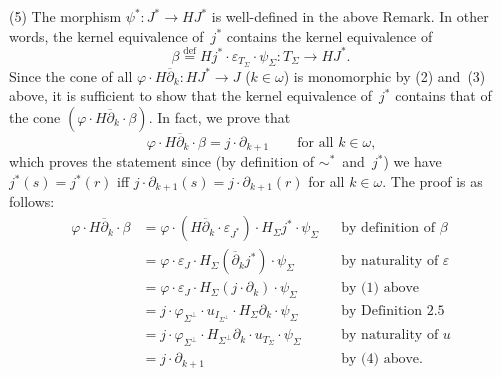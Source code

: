 \documentclass{entcs}
\newcommand{\sims}{\ensuremath{\mathrel{\sim^*}}}
\begin{document}
\begin{pf}
(5) The morphism $\psi^*\colon J^*\to HJ^*$ is well-defined in
the above Remark. In other words, the kernel equivalence of~$j^*$
contains the kernel equivalence of
\[\beta\overset{\text{def}}{=}Hj^*{\cdot}\varepsilon_{T_\Sigma}{\cdot}
\psi_\Sigma\colon T_\Sigma\to HJ^*.\]
Since the cone of all $\varphi{\cdot}H\overline{\partial}_k\colon
HJ^*\to J$ ($k\in\omega$) is monomorphic by (2) and~(3) above, it is
sufficient to show that the kernel equivalence of~$j^*$ contains
that of the cone $(\varphi{\cdot}H\overline{\partial}_k{\cdot}\beta)$. In
fact, we prove that
\[\varphi{\cdot}H\overline{\partial}_k{\cdot}\beta=j{\cdot}\partial_{k+1}\qquad
\text{for all $k\in\omega$,}\]
which proves the statement since (by definition of \sims\ and~$j^*$)
we have $j^*(s)=j^*(r)$ iff
$j{\cdot}\partial_{k+1}(s)=j{\cdot}\partial_{k+1}(r)$ for all $k\in\omega$.
The proof is as follows:
\begin{align*}
\varphi{\cdot}H\overline{\partial}_k{\cdot}\beta&=
\varphi{\cdot}(H\overline{\partial}_k{\cdot}\varepsilon_{J^*}){\cdot}
H_{\Sigma}j^*{\cdot}\psi_\Sigma&&
\text{by definition of $\beta$}\\
&=\varphi{\cdot}\varepsilon_J{\cdot}H_\Sigma(\overline{\partial}_kj^*)
{\cdot}\psi_\Sigma&&\text{by naturality of $\varepsilon$}\\
&=\varphi{\cdot}\varepsilon_J{\cdot}H_\Sigma(j{\cdot}\partial_k){\cdot}\psi_\Sigma&&
\text{by (1) above}\\
&=j{\cdot}\varphi_{\Sigma^\perp}{\cdot}u_{I_{\Sigma^\perp}}{\cdot}H_\Sigma
\partial_k{\cdot}\psi_\Sigma&&\text{by Definition 2.5}\\
&=j{\cdot}\varphi_{\Sigma^\perp}{\cdot}H_{\Sigma^\perp}\partial_k{\cdot}
u_{T_\Sigma}{\cdot}\psi_\Sigma&&\text{by naturality of $u$}\\
&=j{\cdot}\partial_{k+1}&&\text{by (4) above.}
\end{align*}


\end{pf}
\end{document}
